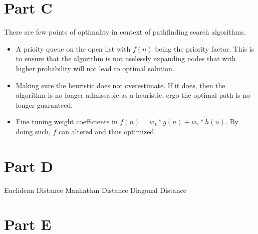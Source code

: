 \documentclass[12pt]{article}
\begin{document}
\section{Part C}
There are few points of optimality in context of pathfinding search algorithms.
\begin{itemize}
  \item A prioity queue on the open list with \(f(n)\) being the priority factor. This is to ensure that the algorithm is not uselessly expanding nodes that with higher probability will not lead to optimal solution.
  \item Making sure the heuristic does not overestimate. If it does, then the algorithm is no longer admissable as a heuristic, ergo the optimal path is no longer guaranteed.
  \item Fine tuning weight coefficients in \(f(n) = w_1*g(n) + w_2*h(n)\). By doing such, \(f\) can altered and thus optimized.
\end{itemize}

\section{Part D}
Euclidean Distance
\newline
Manhattan Distance
\newline
Diagonal Distance

\section{Part E}
\end{document}
